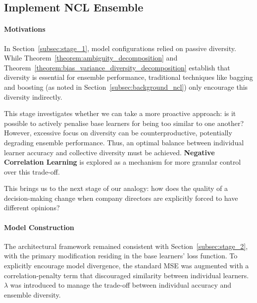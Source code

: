\subsection{Implement NCL Ensemble}
\label{subsec:stage_3}


\paragraph{Motivations}
In Section~\ref{subsec:stage_1}, model configurations relied on passive diversity. While Theorem~\ref{theorem:ambiguity_decomposition} and Theorem~\ref{theorem:bias_variance_diversity_decomposition} establish that diversity is essential for ensemble performance, traditional techniques like bagging and boosting (as noted in Section~\ref{subsec:background_ncl}) only encourage this diversity indirectly. 

This stage investigates whether we can take a more proactive approach: is it possible to actively penalise base learners for being too similar to one another? However, excessive focus on diversity can be counterproductive, potentially degrading ensemble performance. Thus, an optimal balance between individual learner accuracy and collective diversity must be achieved. \textbf{Negative Correlation Learning} is explored as a mechanism for more granular control over this trade-off. 

This brings us to the next stage of our analogy: how does the quality of a decision-making change when company directors are explicitly forced to have different opinions? 


\paragraph{Model Construction}
The architectural framework remained consistent with Section~\ref{subsec:stage_2}, with the primary modification residing in the base learners' loss function. To explicitly encourage model divergence, the standard MSE was augmented with a correlation-penalty term that discouraged similarity between individual learners. $\lambda$ was introduced to manage the trade-off between individual accuracy and ensemble diversity. 


